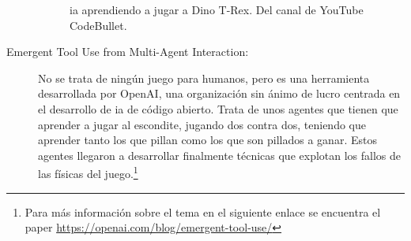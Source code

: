 \begin{description}
\begin{figure}[h]
		\caption{\gls{ia} aprendiendo a jugar a Dino T-Rex. Del canal de YouTube CodeBullet.}
	\end{figure}
	\item[Emergent Tool Use from Multi-Agent Interaction:] No se trata de ningún juego para humanos, pero es una herramienta desarrollada por OpenAI, una organización sin ánimo de lucro centrada en el desarrollo de \gls{ia} de código abierto. Trata de unos agentes que tienen que aprender a jugar al escondite, jugando dos contra dos, teniendo que aprender tanto los que pillan como los que son pillados a ganar. Estos agentes llegaron a desarrollar finalmente técnicas que explotan los fallos de las físicas del juego.\footnote{Para más información sobre el tema en el siguiente enlace se encuentra el paper \url{https://openai.com/blog/emergent-tool-use/}}
\end{description}